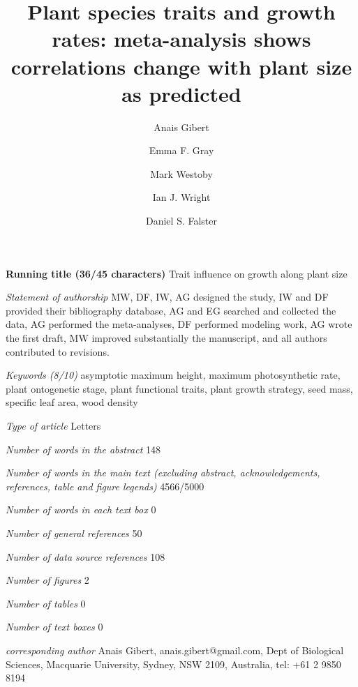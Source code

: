 \documentclass[a4paper]{article}\usepackage[]{graphicx}\usepackage[]{color}
\begin{document}
\newpage

\title{Plant species traits and growth rates: meta-analysis shows correlations change with plant size as predicted}

\author[1]{Anais Gibert}
\author[1]{Emma F. Gray}
\author[1]{Mark Westoby}
\author[1]{Ian J. Wright}
\author[1]{Daniel S. Falster}




\maketitle

\textbf{Running title (36/45 characters)} Trait influence on growth along plant size

\textit{Statement of authorship} MW, DF, IW, AG designed the study, IW and DF provided their bibliography database, AG and EG searched and collected the data, AG performed the meta-analyses, DF performed modeling work, AG wrote the first draft, MW improved substantially the manuscript, and all authors contributed to revisions.

\textit{Keywords (8/10)} asymptotic maximum height, maximum photosynthetic rate, plant ontogenetic stage, plant functional traits, plant growth strategy, seed mass, specific leaf area, wood density 

\textit{Type of article} Letters

\textit{Number of words in the abstract} 148

\textit{Number of words in the main text (excluding abstract, acknowledgements, references, table and figure legends)} 4566/5000

\textit{Number of words in each text box} 0

\textit{Number of general references} 50

\textit{Number of data source references} 108

\textit{Number of figures} 2

\textit{Number of tables} 0

\textit{Number of text boxes} 0

\textit{corresponding author} Anais Gibert, anais.gibert@gmail.com, Dept of Biological Sciences, Macquarie University, Sydney, NSW 2109, Australia, tel: +61 2 9850 8194



\end{document}
